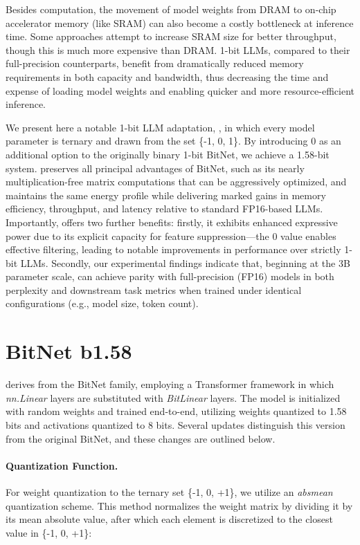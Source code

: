 Besides computation, the movement of model weights from DRAM to on-chip accelerator memory (like SRAM) can also become a costly bottleneck at inference time. Some approaches attempt to increase SRAM size for better throughput, though this is much more expensive than DRAM. 1-bit LLMs, compared to their full-precision counterparts, benefit from dramatically reduced memory requirements in both capacity and bandwidth, thus decreasing the time and expense of loading model weights and enabling quicker and more resource-efficient inference.

We present here a notable 1-bit LLM adaptation, \textbf{}, in which every model parameter is ternary and drawn from the set \{-1, 0, 1\}. By introducing 0 as an additional option to the originally binary 1-bit BitNet, we achieve a 1.58-bit system.  preserves all principal advantages of BitNet, such as its nearly multiplication-free matrix computations that can be aggressively optimized, and maintains the same energy profile while delivering marked gains in memory efficiency, throughput, and latency relative to standard FP16-based LLMs. Importantly,  offers two further benefits: firstly, it exhibits enhanced expressive power due to its explicit capacity for feature suppression—the 0 value enables effective filtering, leading to notable improvements in performance over strictly 1-bit LLMs. Secondly, our experimental findings indicate that, beginning at the 3B parameter scale,  can achieve parity with full-precision (FP16) models in both perplexity and downstream task metrics when trained under identical configurations (e.g., model size, token count).

\section{BitNet b1.58}

 derives from the BitNet family, employing a Transformer framework in which \emph{nn.Linear} layers are substituted with \emph{BitLinear} layers. The model is initialized with random weights and trained end-to-end, utilizing weights quantized to 1.58 bits and activations quantized to 8 bits. Several updates distinguish this version from the original BitNet, and these changes are outlined below.

\paragraph{Quantization Function.} For weight quantization to the ternary set \{-1, 0, +1\}, we utilize an \emph{absmean} quantization scheme. This method normalizes the weight matrix by dividing it by its mean absolute value, after which each element is discretized to the closest value in \{-1, 0, +1\}:

